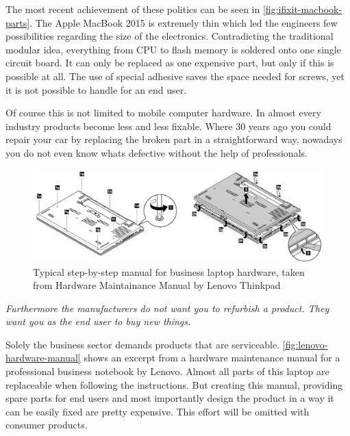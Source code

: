 	The most recent achievement of these politics can be seen in \autoref{fig:ifixit-macbook-parts}. The Apple MacBook 2015 is extremely thin which led the engineers few possibilities regarding the size of the electronics. Contradicting the traditional modular idea, everything from CPU to flash memory is soldered onto one single circuit board. It can only be replaced as one expensive part, but only if this is possible at all. The use of special adhesive saves the space needed for screws, yet it is not possible to handle for an end user.
	
	Of course this is not limited to mobile computer hardware. In almost every industry products become less and less fixable. Where 30 years ago you could repair your car by replacing the broken part in a straightforward way, nowadays you do not even know whats defective without the help of professionals.
	
	\begin{figure}[H]
		\includegraphics[width=\textwidth]{../images/common-manual.png}
		\centering
		\caption[Typical step-by-step manual for business laptop hardware, taken from Hardware Maintainance Manual by Lenovo Thinkpad]{Typical step-by-step manual for business laptop hardware, taken from Hardware Maintainance Manual by Lenovo Thinkpad\footnotemark}
		\label{fig:lenovo-hardware-manual}
	\end{figure}
	
	\textit{Furthermore the manufacturers do not want you to refurbish a product. They want you as the end user to buy new things.}
	
	Solely the business sector demands products that are serviceable. \autoref{fig:lenovo-hardware-manual} shows an excerpt from a hardware maintenance manual for a professional business notebook by Lenovo. Almost all parts of this laptop are replaceable when following the instructions. But creating this manual, providing spare parts for end users and most importantly design the product in a way it can be easily fixed are pretty expensive. This effort will be omitted with consumer products.
	
